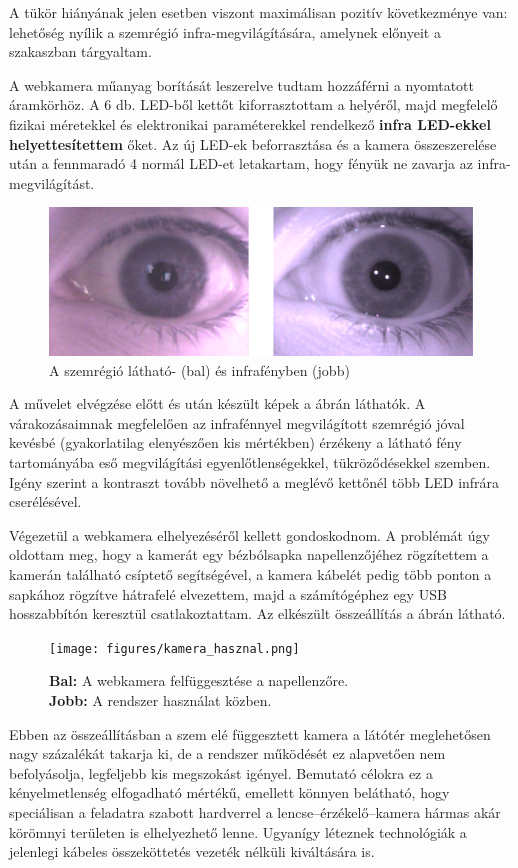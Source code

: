 A tükör hiányának jelen esetben viszont maximálisan pozitív következménye van: lehetőség nyílik a szemrégió infra-megvilágítására, amelynek előnyeit a  szakaszban tárgyaltam.

\bigskip

A webkamera műanyag borítását leszerelve tudtam hozzáférni a nyomtatott áramkörhöz. A 6 db. LED-ből kettőt kiforrasztottam a helyéről, majd megfelelő fizikai méretekkel és elektronikai paraméterekkel rendelkező \textbf{infra LED-ekkel helyettesítettem} őket. Az új LED-ek beforrasztása és a kamera összeszerelése után a fennmaradó 4 normál LED-et letakartam, hogy fényük ne zavarja az infra-megvilágítást.

\begin{figure}[!ht]
\centering
\includegraphics[width=120mm, keepaspectratio]{figures/infra_ossze.png}
\caption{A szemrégió látható- (bal) és infrafényben (jobb)}
\label{fig:infra_ossze}
\end{figure}

A művelet elvégzése előtt és után készült képek a  ábrán láthatók. A várakozásaimnak megfelelően az infrafénnyel megvilágított szemrégió jóval kevésbé (gyakorlatilag elenyészően kis mértékben) érzékeny a látható fény tartományába eső megvilágítási egyenlőtlenségekkel, tükröződésekkel szemben. Igény szerint a kontraszt tovább növelhető a meglévő kettőnél több LED infrára cserélésével.

\bigskip

Végezetül a webkamera elhelyezéséről kellett gondoskodnom. A problémát úgy oldottam meg, hogy a kamerát egy bézbólsapka napellenzőjéhez rögzítettem a kamerán található csíptető segítségével, a kamera kábelét pedig több ponton a sapkához rögzítve hátrafelé elvezettem, majd a számítógéphez egy USB hosszabbítón keresztül csatlakoztattam. Az elkészült összeállítás a  ábrán látható.

\begin{figure}[!ht]
\centering
\texttt{[image: figures/kamera\_hasznal.png]}
\caption{\textbf{Bal:} A webkamera felfüggesztése a napellenzőre. \\
\textbf{Jobb:} A rendszer használat közben.}
\label{fig:kamera_hasznal}
\end{figure}

Ebben az összeállításban a szem elé függesztett kamera a látótér meglehetősen nagy százalékát takarja ki, de a rendszer működését ez alapvetően nem befolyásolja, legfeljebb kis megszokást igényel. Bemutató célokra ez a kényelmetlenség elfogadható mértékű, emellett könnyen belátható, hogy speciálisan a feladatra szabott hardverrel a lencse--érzékelő--kamera hármas akár körömnyi területen is elhelyezhető lenne. Ugyanígy léteznek technológiák a jelenlegi kábeles összeköttetés vezeték nélküli kiváltására is.